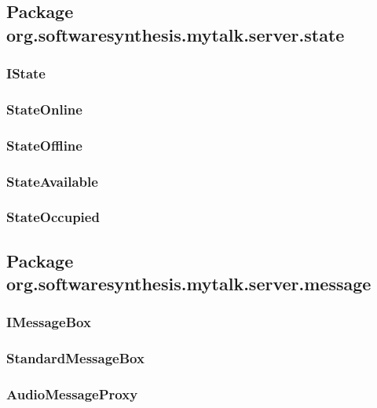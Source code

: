 \subsection{Package org.softwaresynthesis.mytalk.server.state}\label{sec:state}

\subsubsection{IState}\label{sec:istate}

\subsubsection{StateOnline}\label{sec:stateonline}

\subsubsection{StateOffline}\label{sec:stateoffline}

\subsubsection{StateAvailable}\label{sec:stateavailable}

\subsubsection{StateOccupied}\label{sec:stateoccupied}

\subsection{Package org.softwaresynthesis.mytalk.server.message}\label{sec:message}

\subsubsection{IMessageBox}\label{sec:imessagebox}

\subsubsection{StandardMessageBox}\label{sec:standardmessagebox}

\subsubsection{AudioMessageProxy}\label{sec:audiomessageproxy}

